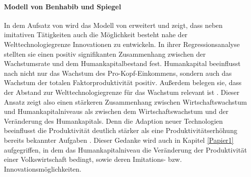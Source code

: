 \paragraph{Modell von Benhabib und Spiegel}
In dem Aufsatz von \citet{Benhabib.1994} wird das Modell von \citet{Nelson.1966} erweitert und zeigt, dass neben imitativen T{\"a}tigkeiten auch die M{\"o}glichkeit besteht nahe der Welttechnologiegrenze Innovationen zu entwickeln. In ihrer Regressionsanalyse stellten sie einen positiv signifikanten Zusammenhang zwischen der Wachstumsrate und dem Humankapitalbestand fest. Humankapital beeinflusst nach \citet{Benhabib.1994} nicht nur das Wachstum des Pro-Kopf-Einkommens, sondern auch das Wachstum der totalen Faktorproduktivit{\"a}t positiv.  Au{\ss}erdem belegen sie, dass der Abstand zur Welttechnologiegrenze f{\"u}r das Wachstum relevant ist \citep{Benhabib.1994}. Dieser Ansatz zeigt also einen st{\"a}rkeren Zusammenhang zwischen Wirtschaftswachstum und Humankapitalniveaus als zwischen dem Wirtschaftswachstum und der Ver{\"a}nderung des Humankapitals. Denn die Adaption neuer Technologien beeinflusst die Produktivit{\"a}t deutlich st{\"a}rker als eine Produktivit{\"a}tserh{\"o}hung bereits bekannter Aufgaben \citep{Benhabib.1994}. Dieser Gedanke wird auch in Kapitel \ref{Papier1} aufgegriffen, in dem das Humankapitalniveau die Ver{\"a}nderung der Produktivit{\"a}t einer Volkswirtschaft bedingt, sowie deren Imitations- bzw. Innovationsm{\"o}glichkeiten. 


